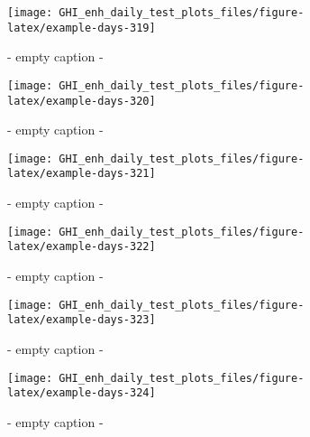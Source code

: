 \documentclass[
  10pt,
  a4paper,oneside]{article}
\begin{document}
\begin{figure}[H]

{\centering \texttt{[image: GHI\_enh\_daily\_test\_plots\_files/figure-latex/example-days-319]} 

}

\caption{ - empty caption - }\label{fig:example-days-319}
\end{figure}

\begin{figure}[H]

{\centering \texttt{[image: GHI\_enh\_daily\_test\_plots\_files/figure-latex/example-days-320]} 

}

\caption{ - empty caption - }\label{fig:example-days-320}
\end{figure}

\begin{figure}[H]

{\centering \texttt{[image: GHI\_enh\_daily\_test\_plots\_files/figure-latex/example-days-321]} 

}

\caption{ - empty caption - }\label{fig:example-days-321}
\end{figure}

\begin{figure}[H]

{\centering \texttt{[image: GHI\_enh\_daily\_test\_plots\_files/figure-latex/example-days-322]} 

}

\caption{ - empty caption - }\label{fig:example-days-322}
\end{figure}

\begin{figure}[H]

{\centering \texttt{[image: GHI\_enh\_daily\_test\_plots\_files/figure-latex/example-days-323]} 

}

\caption{ - empty caption - }\label{fig:example-days-323}
\end{figure}

\begin{figure}[H]

{\centering \texttt{[image: GHI\_enh\_daily\_test\_plots\_files/figure-latex/example-days-324]} 

}

\caption{ - empty caption - }\label{fig:example-days-324}
\end{figure}
\end{document}
